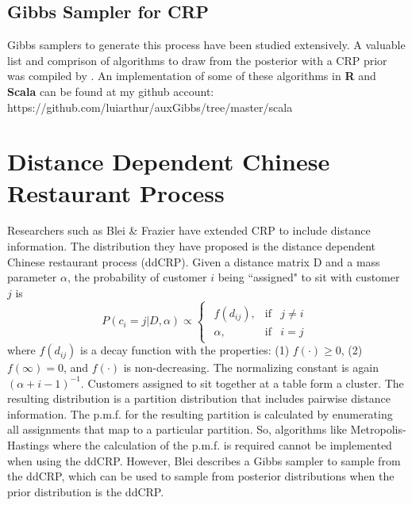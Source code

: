 \subsection{Gibbs Sampler for CRP}
Gibbs samplers to generate this process have been studied extensively.  A
valuable list and comprison of algorithms to draw from the posterior with a CRP
prior was compiled by \cite{neal}. An implementation of some of these
algorithms in \textbf{R} and \textbf{Scala} can be found at my github account:
https://github.com/luiarthur/auxGibbs/tree/master/scala\\



\section{Distance Dependent Chinese Restaurant Process}
Researchers such as Blei \& Frazier have extended CRP to include distance
information. The distribution they have proposed is the distance dependent
Chinese restaurant process (ddCRP). Given a distance matrix D and a mass
parameter $\alpha$, the probability of customer $i$ being ``assigned" to sit
with customer $j$ is 
\begin{equation}
  P(c_i=j|D,\alpha) \propto 
  \begin{cases}
    \begin{array}{rll}
      f(d_{ij}), & \text{if} & j \ne i\\
      \alpha,    & \text{if} & i=j
    \end{array}  
  \end{cases}
\end{equation}
where $f(d_{ij})$ is a decay function with the properties: (1) $f(\cdot) \ge
0$, (2) $f(\infty) = 0$, and $f(\cdot)$ is non-decreasing. The normalizing
constant is again $(\alpha+i-1)^{-1}$. Customers assigned to sit together at a
table form a cluster. The resulting distribution is a partition distribution
that includes pairwise distance information. The p.m.f. for the resulting
partition is calculated by enumerating all assignments that map to a particular
partition. So, algorithms like Metropolis-Hastings where the calculation of the
p.m.f. is required cannot be implemented when using the ddCRP. However, Blei
describes a Gibbs sampler to sample from the ddCRP, which can be used to sample
from posterior distributions when the prior distribution is the ddCRP.

